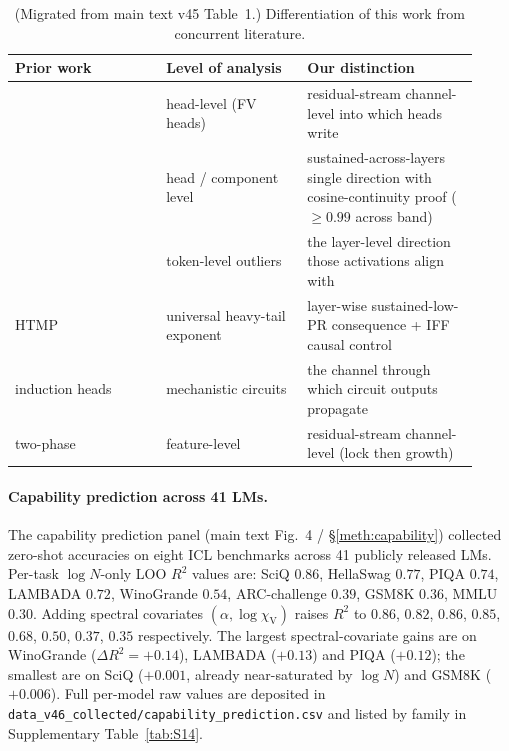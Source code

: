 \documentclass[11pt,a4paper]{article}
\begin{document}
\begin{table}[h]
\centering
\small
\caption{(Migrated from main text v45 Table~1.) Differentiation of
this work from concurrent literature.}
\label{tab:S16}
\begin{tabular}{p{0.30\linewidth}p{0.28\linewidth}p{0.34\linewidth}}
\toprule
Prior work & Level of analysis & Our distinction \\
\midrule
\citet{cabannes2025} & head-level (FV heads) &
residual-stream channel-level into which heads write \\
\citet{yang2025} & head / component level &
sustained-across-layers single direction with cosine-continuity proof
($\geq 0.99$ across band) \\
\citet{sun2024} & token-level outliers &
the layer-level direction those activations align with \\
\citet{hodgkinson2025} HTMP & universal heavy-tail exponent &
layer-wise sustained-low-PR consequence + IFF causal control \\
\citet{olsson2022} induction heads & mechanistic circuits &
the channel through which circuit outputs propagate \\
\citet{singh2024} two-phase &
feature-level &
residual-stream channel-level (lock then growth) \\
\bottomrule
\end{tabular}
\end{table}

\paragraph{Capability prediction across 41 LMs.}
The capability prediction panel (main text Fig.~4 /
\S\ref{meth:capability}) collected zero-shot accuracies on eight
ICL benchmarks across 41 publicly released LMs. Per-task
$\log N$-only LOO $R^2$ values are: SciQ $0.86$, HellaSwag $0.77$,
PIQA $0.74$, LAMBADA $0.72$, WinoGrande $0.54$, ARC-challenge
$0.39$, GSM8K $0.36$, MMLU $0.30$. Adding spectral covariates
$(\alpha, \log\chi_\mathrm{V})$ raises $R^2$ to $0.86$, $0.82$,
$0.86$, $0.85$, $0.68$, $0.50$, $0.37$, $0.35$ respectively.
The largest spectral-covariate gains are on WinoGrande
($\Delta R^2 = +0.14$), LAMBADA ($+0.13$) and PIQA ($+0.12$);
the smallest are on SciQ ($+0.001$, already near-saturated by
$\log N$) and GSM8K ($+0.006$). Full per-model raw values are
deposited in \texttt{data\_v46\_collected/capability\_prediction.csv}
and listed by family in Supplementary Table~\ref{tab:S14}.
\end{document}
